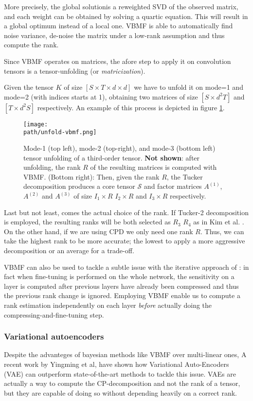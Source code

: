 More precisely, the global solutionis a reweighted SVD of the observed matrix, and each weight can be obtained by solving a quartic equation. This will result in a global optimum instead of a local one. VBMF is able to  automatically find noise variance, de-noise the matrix under a low-rank assumption and thus compute the rank. 
\newline

Since VBMF operates on matrices, the afore step to apply it on convolution tensors is a tensor-unfolding (or \emph{matricization}). 

Given the tensor $K$ of size $[S \times T \times d \times d]$ we have to unfold it on mode=1 and mode=2 (with indices starts at 1), obtaining two matrices of size $[S \times d^2T]$ and $[T \times d^2S]$ respectively. An example of this process is depicted in figure \ref{fig:vbmf}.

\begin{figure}[h!]
 \centering
 \texttt{[image: \\path/unfold-vbmf.png]} 
 \caption{Mode-1 (top left), mode-2 (top-right), and mode-3 (bottom left) tensor unfolding of a third-order tensor. \textbf{Not shown}: after unfolding, the rank $R$ of the resulting matrices is computed with VBMF.
 (Bottom right): Then, given the rank $R$, the Tucker decomposition produces a core tensor $\mathcal{S}$ and  factor matrices $A^(1)$, $A^(2)$ and $A^(3)$ of size $I_1 \times R$ $I_2 \times R$ and $I_3 \times R$ respectively. } 
 \label{fig:vbmf}
\end{figure}


Last but not least, comes the actual choice of the rank. If Tucker-2 decomposition is employed, the resulting ranks will be both selected as $R_3$ $R_4$ as in Kim et al. \parencite{Tucker-mobile}. On the other hand, if we are using CPD we only need one rank $R$. Thus, we can take the highest rank to be more accurate;
the lowest to apply a more aggressive decomposition or an average for a trade-off.
\newline 

VBMF can also be used to tackle a subtle issue with the iterative approach of \parencite{astrid2017}: in fact when fine-tuning is performed on the whole network, the sensitivity on a layer is computed after previous layers have already been compressed and thus the previous rank change is ignored. Employing VBMF enable us to compute a rank estimation independently on each layer \emph{before} actually doing the compressing-and-fine-tuning step. 


\subsubsection{Variational autoencoders}
Despite the advanteges of bayesian methods like VBMF over multi-linear ones, 
A recent work by Yingming et al, \parencite{VAE} have shown how Variational Auto-Encoders (VAE) can outperform state-of-the-art methods to tackle this issue. VAEs are actually a way to compute the CP-decomposition and not the rank of a tensor, but they are capable of doing so without depending heavily on a correct rank.
\newline 

